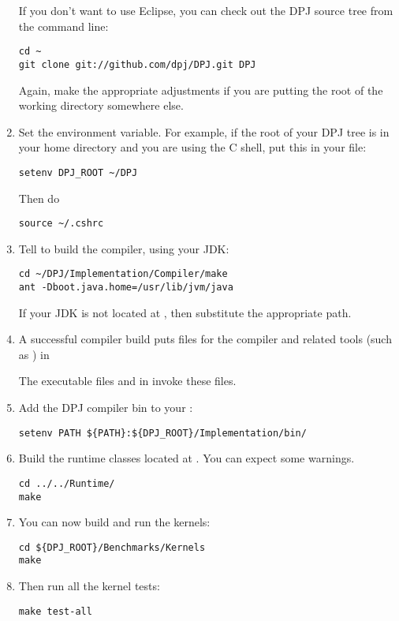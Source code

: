 \begin{enumerate}
If you don't want to use Eclipse, you can check out the DPJ source
tree from the command line:
%
\begin{verbatim}
cd ~
git clone git://github.com/dpj/DPJ.git DPJ
\end{verbatim}
%
Again, make the appropriate adjustments if you are putting the root of
the working directory somewhere else.
%
\item Set the  environment variable.  For example, if
  the root of your DPJ tree is  in your home directory and
  you are using the C shell, put this in your  file:
%
\begin{verbatim}
setenv DPJ_ROOT ~/DPJ
\end{verbatim}
%
Then do
%
\begin{verbatim}
source ~/.cshrc
\end{verbatim}
%
\item Tell  to build the compiler, using your JDK: 
%
\begin{verbatim}
cd ~/DPJ/Implementation/Compiler/make
ant -Dboot.java.home=/usr/lib/jvm/java
\end{verbatim}
%
If your JDK is not located at , then substitute
the appropriate path.
%
\item A successful compiler build puts  files for the
  compiler and related tools (such as ) in
The executable files  and  in
 invoke these  files.
%
\item Add the DPJ compiler bin to your :
\begin{verbatim}
setenv PATH ${PATH}:${DPJ_ROOT}/Implementation/bin/
\end{verbatim}
\item Build the runtime classes located at
  .  You can expect some
  warnings.
\begin{verbatim}
cd ../../Runtime/
make
\end{verbatim}

\item You can now build and run the kernels:
\begin{verbatim}
cd ${DPJ_ROOT}/Benchmarks/Kernels
make
\end{verbatim}

\item Then run all the kernel tests: 
\begin{verbatim}
make test-all
\end{verbatim}


\end{enumerate}

